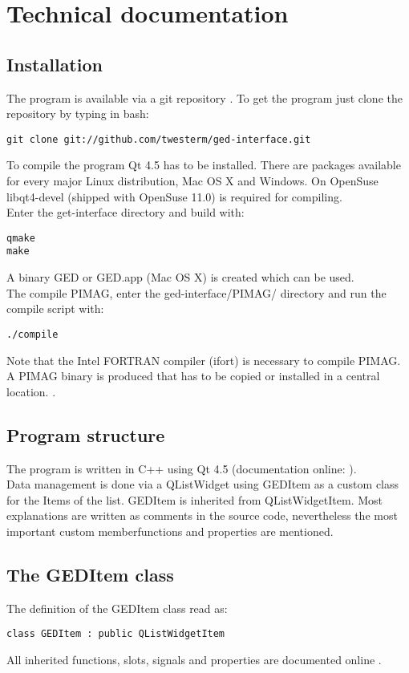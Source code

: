 \section{Technical documentation}\label{tech}
\subsection{Installation}
The program is available via a git repository \cite{git}. To get the program just clone the repository by typing in bash: 
\begin{lstlisting}
git clone git://github.com/twesterm/ged-interface.git
\end{lstlisting}
To compile the program Qt 4.5 \cite{qt} has to be installed. There are packages available for every major Linux distribution, Mac OS X and Windows. On OpenSuse \cite{opensuse} libqt4-devel (shipped with OpenSuse 11.0)  is required for compiling. \\
Enter the get-interface directory and build with: 
\begin{lstlisting}
qmake
make
\end{lstlisting}
A binary GED or GED.app (Mac OS X) is created which can be used. \\
The compile PIMAG, enter the ged-interface/PIMAG/ directory and run the compile script with: 
\begin{lstlisting}
./compile
\end{lstlisting}
Note that the Intel FORTRAN compiler (ifort) \cite{ifort}  is necessary to compile PIMAG. A PIMAG binary is produced that has to be copied or installed in a central location. . 

\subsection{Program structure}
The program is written in C++ using Qt 4.5 (documentation online: \cite{qt}).\\
 Data management is done via a QListWidget using GEDItem as a custom class for the Items of the list. GEDItem is inherited from QListWidgetItem. Most explanations are written as comments in the source code, nevertheless the most important custom memberfunctions and properties are mentioned. \\
 
 
\subsection{The GEDItem class}
The definition of the GEDItem class read as: 
\begin{lstlisting}
class GEDItem : public QListWidgetItem
\end{lstlisting}
All inherited functions, slots, signals and properties are documented online \cite{qt}.     \\
